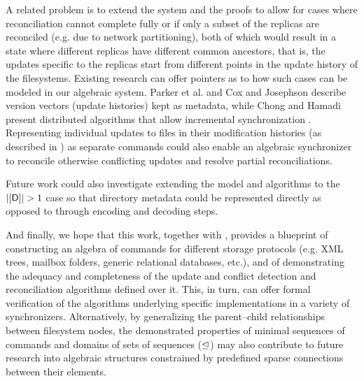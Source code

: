 A related problem is to extend the system and the proofs
to allow for cases where reconciliation cannot
complete fully
or if only a subset of the replicas are reconciled 
(e.g. due to network partitioning),
both of which would result in a state where different replicas
have different common ancestors, that is,
the updates specific to the replicas start from different points
in the update history of the filesystems.
Existing research can offer pointers as to how such cases can be modeled
in our algebraic system.
Parker et al. \cite{PPRS} and Cox and Josephson \cite{CJ}
describe version vectors (update histories) kept as metadata,
while Chong and Hamadi present distributed algorithms that allow incremental synchronization \cite{CH}.
Representing individual updates to files
in their modification histories (as described in \cite{CJ})
as separate commands could also enable an algebraic synchronizer to reconcile otherwise
conflicting updates and resolve partial reconciliations.

Future work could also investigate extending the 
model and algorithms to the $|\setd|>1$ case
so that directory metadata could be represented directly
as opposed to through encoding and decoding steps.

And finally, we hope that this work, together with \cite{NREC}, provides
a blueprint of constructing an algebra of commands for different storage protocols
(e.g. XML trees, mailbox folders, generic relational databases, etc.),
and of demonstrating the adequacy and completeness of the update and conflict detection and reconciliation
algorithms defined over it.
This, in turn, can offer formal verification of the algorithms underlying
specific implementations in a variety of synchronizers.
Alternatively, by generalizing the parent--child relationships between filesystem nodes,
the demonstrated properties of minimal sequences of commands
and domains of sets of sequences ($\trianglelefteq$)
may also contribute to future research into algebraic structures
constrained by predefined sparse connections between their elements.

